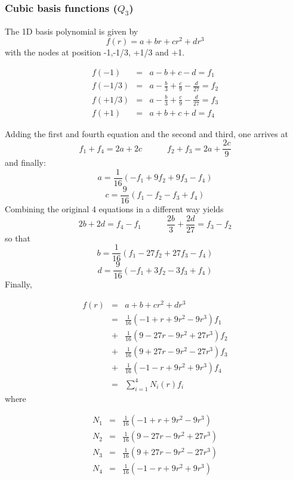 \subsubsection{Cubic basis functions ($Q_3$)}

The 1D basis polynomial is given by
\[
f(r)=a+br+cr^2+dr^3
\]
with the nodes at position -1,-1/3, +1/3 and +1.

\begin{eqnarray}
f(-1)   &=& a-b+c-d = f_1 \nonumber\\
f(-1/3) &=& a-\frac{b}{3}+\frac{c}{9}-\frac{d}{27} = f_2 \nonumber\\
f(+1/3) &=& a-\frac{b}{3}+\frac{c}{9}-\frac{d}{27} = f_3 \nonumber\\
f(+1)   &=& a+b+c+d = f_4 \nonumber
\end{eqnarray}

Adding the first and fourth equation and the second and third, one arrives at
\[
f_1+f_4 = 2a+2c \quad\quad\quad f_2+f_3=2a+\frac{2c}{9}
\]
and finally:
\[
a=\frac{1}{16} \left( -f_1 + 9f_2 + 9f_3 - f_4  \right)
\]
\[
c=\frac{9}{16}\left(f_1-f_2-f_3+f_4\right)
\]
Combining the original 4 equations in a different way yields
\[
2b+2d=f_4-f_1 
\quad\quad\quad
\frac{2b}{3} + \frac{2d}{27} = f_3-f_2
\]
so that
\[
b=\frac{1}{16} \left( f_1 - 27f_2 + 27f_3 -f_4   \right)
\]
\[
d=\frac{9}{16} \left( -f_1 + 3f_2 - 3f_3 + f_4 \right)
\]
Finally,

\begin{eqnarray}
f(r) 
&=& a+b+cr^2+dr^3 \nonumber\\
&=& \frac{1}{16} (-1+  r +9r^2 - 9r^3 )f_1 \nonumber\\ 
&+& \frac{1}{16} ( 9-27r -9r^2 +27r^3 )f_2 \nonumber\\ 
&+& \frac{1}{16} ( 9+27r -9r^2 -27r^3 )f_3 \nonumber\\ 
&+& \frac{1}{16} (-1-  r +9r^2 + 9r^3 )f_4 \nonumber\\ 
&=& \sum_{i=1}^4 N_i(r) f_i \nonumber
\end{eqnarray}
where
\begin{mdframed}[backgroundcolor=blue!5]
\begin{eqnarray}
N_1&=& \frac{1}{16} (-1+  r+9r^2- 9r^3 ) \nonumber\\ 
N_2&=& \frac{1}{16} ( 9-27r-9r^2+27r^3 ) \nonumber\\ 
N_3&=& \frac{1}{16} ( 9+27r-9r^2-27r^3 ) \nonumber\\ 
N_4&=& \frac{1}{16} (-1-  r+9r^2+ 9r^3 ) \nonumber
\end{eqnarray}
\end{mdframed}


